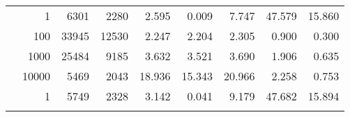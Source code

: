 \begin{table}
\begin{tabular}{rrrrrrrrr}
	            
	        
				\noalign{\smallskip}\hline
				\multirow{ 4 }{*}{ 80000 } &
				
					
					 
					\multirow{ 1 }{*}{ 1 } &
					
						
							    
							     6301  & 2280  
	                           & 2.595 & 0.009 & 7.747
	                           & 47.579 & 15.860  \\
	                
	            
					 &  
					 
					\multirow{ 1 }{*}{ 100 } &
					
						
							    
							     33945  & 12530  
	                           & 2.247 & 2.204 & 2.305
	                           & 0.900 & 0.300  \\
	                
	            
					 &  
					 
					\multirow{ 1 }{*}{ 1000 } &
					
						
							    
							     25484  & 9185  
	                           & 3.632 & 3.521 & 3.690
	                           & 1.906 & 0.635  \\
	                
	            
					 &  
					 
					\multirow{ 1 }{*}{ 10000 } &
					
						
							    
							     5469  & 2043  
	                           & 18.936 & 15.343 & 20.966
	                           & 2.258 & 0.753  \\
	                
	            
	        
				\noalign{\smallskip}\hline
				\multirow{ 4 }{*}{ 160000 } &
				
					
					 
					\multirow{ 1 }{*}{ 1 } &
					
						
							    
							     5749  & 2328  
	                           & 3.142 & 0.041 & 9.179
	                           & 47.682 & 15.894  \\
	                
	            
					 &  
					 

\end{tabular}
\end{table}

